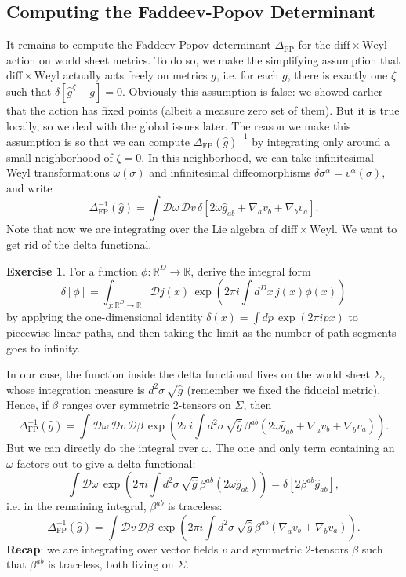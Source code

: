 \documentclass{report}
\theoremstyle{plain}
\theoremstyle{definition}
\newtheorem{exercise}{Exercise}[section]
\theoremstyle{remark}
\newcommand{\bR}{\mathbb{R}}
\newcommand{\cD}{\mathcal{D}}
\newcommand{\diff}{\mathrm{diff}}
\newcommand{\Weyl}{\mathrm{Weyl}}
\newcommand{\detFP}{\Delta_{\text{FP}}}
\begin{document}
\subsection{Computing the Faddeev-Popov Determinant}

It remains to compute the Faddeev-Popov determinant $\detFP$ for the
$\diff \times \Weyl$ action on world sheet metrics. To do so, we make
the simplifying assumption that $\diff \times \Weyl$ actually acts
freely on metrics $g$, i.e. for each $g$, there is exactly one $\zeta$
such that $\delta[\hat{g}^\zeta - g] = 0$. Obviously this assumption
is false: we showed earlier that the action has fixed points (albeit a
measure zero set of them). But it is true locally, so we deal with the
global issues later. The reason we make this assumption is so that we
can compute $\detFP(\hat{g})^{-1}$ by integrating only around a small
neighborhood of $\zeta = 0$. In this neighborhood, we can take
infinitesimal Weyl transformations $\omega(\sigma)$ and infinitesimal
diffeomorphisms $\delta \sigma^\alpha = v^\alpha(\sigma)$, and write
\[ \detFP^{-1}(\hat{g}) = \int \cD \omega \, \cD v \, \delta[2\omega \hat{g}_{ab} + \nabla_a v_b + \nabla_b v_a]. \]
Note that now we are integrating over the Lie algebra of $\diff \times
\Weyl$. We want to get rid of the delta functional.

\begin{exercise}
  For a function $\phi\colon \bR^D \to \bR$, derive the integral form
  \[ \delta[\phi] = \int_{j\colon \bR^D \to \bR} \cD j(x) \, \exp\left(2\pi i \int d^Dx \, j(x)\phi(x)\right) \]
  by applying the one-dimensional identity $\delta(x) = \int dp \,
  \exp(2\pi ipx)$ to piecewise linear paths, and then taking the limit
  as the number of path segments goes to infinity.
\end{exercise}

In our case, the function inside the delta functional lives on the
world sheet $\Sigma$, whose integration measure is $d^2\sigma \,
\sqrt{\hat{g}}$ (remember we fixed the fiducial metric). Hence, if
$\beta$ ranges over symmetric $2$-tensors on $\Sigma$, then
\[ \detFP^{-1}(\hat{g}) = \int \cD \omega \, \cD v \, \cD \beta \, \exp\left(2\pi i \int d^2\sigma \, \sqrt{\hat{g}} \, \beta^{ab}(2\omega \hat{g}_{ab} + \nabla_a v_b + \nabla_b v_a)\right). \]
But we can directly do the integral over $\omega$. The one and only
term containing an $\omega$ factors out to give a delta functional:
\[ \int \cD \omega \, \exp\left(2\pi i \int d^2\sigma \, \sqrt{\hat{g}} \, \beta^{ab} (2\omega \hat{g}_{ab})\right) = \delta[2\beta^{ab}\hat{g}_{ab}], \]
i.e. in the remaining integral, $\beta^{ab}$ is traceless:
\[ \detFP^{-1}(\hat{g}) = \int \cD v \, \cD \beta \, \exp\left(2\pi i \int d^2\sigma \, \sqrt{\hat{g}} \, \beta^{ab}(\nabla_a v_b + \nabla_b v_a)\right). \]
{\bf Recap}: we are integrating over vector fields $v$ and symmetric
$2$-tensors $\beta$ such that $\beta^{ab}$ is traceless, both living
on $\Sigma$.
\end{document}

